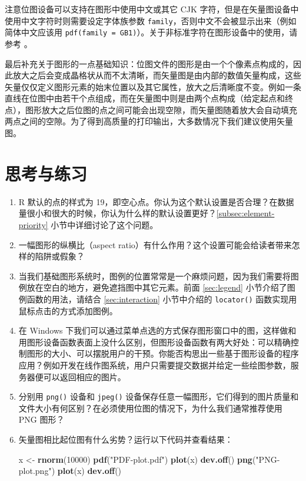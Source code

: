 \documentclass[
  b5paper,
  UTF8,twoside]{book}
\newenvironment{Shaded}{\begin{snugshade}}{\end{snugshade}}
\newcommand{\DecValTok}[1]{\textcolor[rgb]{0.00,0.00,0.81}{#1}}
\newcommand{\FunctionTok}[1]{\textcolor[rgb]{0.13,0.29,0.53}{\textbf{#1}}}
\newcommand{\NormalTok}[1]{#1}
\newcommand{\OtherTok}[1]{\textcolor[rgb]{0.56,0.35,0.01}{#1}}
\newcommand{\StringTok}[1]{\textcolor[rgb]{0.31,0.60,0.02}{#1}}
\begin{document}
注意位图设备可以支持在图形中使用中文或其它 CJK 字符，但是在矢量图设备中使用中文字符时则需要设定字体族参数 \texttt{family}，否则中文不会被显示出来（例如简体中文应该用 \texttt{pdf(family\ =\ \textquotesingle{}GB1\textquotesingle{})}）。关于非标准字符在图形设备中的使用，请参考 \citet{Murrell06} 。

最后补充关于图形的一点基础知识：位图文件的图形是由一个个像素点构成的，因此放大之后会变成晶格状从而不太清晰，而矢量图是由内部的数值矢量构成，这些矢量仅仅定义图形元素的始末位置以及其它属性，放大之后清晰度不变。例如一条直线在位图中由若干个点组成，而在矢量图中则是由两个点构成（给定起点和终点），图形放大之后位图的点之间可能会出现空隙，而矢量图随着放大会自动填充两点之间的空隙。为了得到高质量的打印输出，大多数情况下我们建议使用矢量图。

\section{思考与练习}\label{ux601dux8003ux4e0eux7ec3ux4e60-8}

\begin{enumerate}
\def\labelenumi{\arabic{enumi}.}
\item
  R 默认的点的样式为 19，即空心点。你认为这个默认设置是否合理？在数据量很小和很大的时候，你认为什么样的默认设置更好？\ref{subsec:element-priority} 小节中详细讨论了这个问题。
\item
  一幅图形的纵横比（aspect ratio）有什么作用？这个设置可能会给读者带来怎样的陷阱或假象？
\item
  当我们基础图形系统时，图例的位置常常是一个麻烦问题，因为我们需要将图例放在空白的地方，避免遮挡图中其它元素。前面 \ref{sec:legend} 小节介绍了图例函数的用法，请结合 \ref{sec:interaction} 小节中介绍的 \texttt{locator()} 函数实现用鼠标点击的方式添加图例。
\item
  在 Windows 下我们可以通过菜单点选的方式保存图形窗口中的图，这样做和用图形设备函数表面上没什么区别，但图形设备函数有两大好处：可以精确控制图形的大小、可以摆脱用户的干预。你能否构思出一些基于图形设备的程序应用？例如开发在线作图系统，用户只需要提交数据并给定一些绘图参数，服务器便可以返回相应的图片。
\item
  分别用 \texttt{png()} 设备和 \texttt{jpeg()} 设备保存任意一幅图形，它们得到的图片质量和文件大小有何区别？在必须使用位图的情况下，为什么我们通常推荐使用 PNG 图形？
\item
  矢量图相比起位图有什么劣势？运行以下代码并查看结果：

\begin{Shaded}
\begin{Highlighting}[]
\NormalTok{x }\OtherTok{\textless{}{-}} \FunctionTok{rnorm}\NormalTok{(}\DecValTok{10000}\NormalTok{)}
\FunctionTok{pdf}\NormalTok{(}\StringTok{"PDF{-}plot.pdf"}\NormalTok{)}
\FunctionTok{plot}\NormalTok{(x)}
\FunctionTok{dev.off}\NormalTok{()}
\FunctionTok{png}\NormalTok{(}\StringTok{"PNG{-}plot.png"}\NormalTok{)}
\FunctionTok{plot}\NormalTok{(x)}
\FunctionTok{dev.off}\NormalTok{()}
\end{Highlighting}
\end{Shaded}
\end{enumerate}
\end{document}
